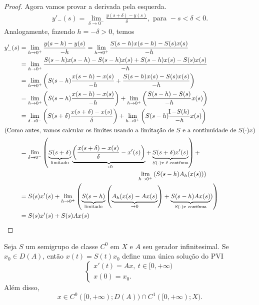 \begin{proof}
Agora vamos provar a derivada pela esquerda.
\begin{align*}
y'_-(s)=\lim_{\delta\to 0^-}\frac{y(s+\delta)-y(s)}{\delta}, \text{ para } -s<\delta <0.
\end{align*}
Analogamente, fazendo $h=-\delta>0$, temos
\begin{align*}
y'_-(s)&=\lim_{h\to 0^+}\frac{y(s-h)-y(s)}{-h}
=\lim_{h\to 0^+}\frac{S(s-h)x(s-h)-S(s)x(s)}{-h}\\
& = \lim_{h\to 0^+}\frac{S(s-h)x(s-h)-S(s-h)x(s)+S(s-h)x(s)-S(s)x(s)}{-h}\\
& = \lim_{h\to 0^+}
\left(S(s-h)\frac{x(s-h)-x(s)}{-h}+\frac{S(s-h)x(s)-S(s)x(s)}{-h}
\right)\\
& = \lim_{h\to 0^+}
\left(S(s-h)\frac{x(s-h)-x(s)}{-h}\right)
+\lim_{h\to 0^+}\left(\frac{S(s-h)-S(s)}{-h}x(s)
\right)\\
& = \lim_{\delta\to 0^-}
\left(S(s+\delta)\frac{x(s+\delta)-x(s)}{\delta}\right)+
\lim_{h\to0^+}\left(S(s-h)\frac{\id- S(h)}{-h}x(s)
\right)\\
\shortintertext{(Como antes, vamos calcular os limites usando a limitação de $S$ e a continuidade de $S(\cdot)x$)}
&\begin{multlined}
= \lim_{\delta\to 0^-}
\left(\underbrace{S(s+\delta)}_{\text{limitado}}
\underbrace{\left(\frac{x(s+\delta)-x(s)}{\delta}-x'(s)\right)}_{\to 0}+\underbrace{S(s+\delta)x'(s)}_{S(\cdot)x \text{ é contínua}}
\right)+\\
\lim_{h\to0^+}\left(S(s-h)A_h(x(s))
\right)
\end{multlined} \\
&= S(s)x'(s)+\lim_{h\to0^+}\left(\underbrace{S(s-h)}_{\text{limitado}}
\left(\underbrace{A_h(x(s)-Ax(s)}_{\to 0}\right)+\underbrace{S(s-h)Ax(s)}_{S(\cdot)x \text{ contínua}})
\right)\\
& = S(s)x'(s)+S(s)Ax(s)
\end{align*}




\end{proof}

\begin{theorem}\label{PVI}

Seja $S$ um semigrupo de classe $C^0$ em $X$ e $A$ seu gerador infinitesimal. Se {$x_0\in D(A)$}, então $x(t)=S(t)x_0$ define {uma única solução} do PVI
\[
\begin{cases}
    x'(t)=Ax,\ t\in [0,+\infty)\\
    x(0)=x_0.
\end{cases}
\]
Além disso, \[x\in  C^0([0,+\infty);D(A))\cap C^1([0,+\infty);X).\]
\end{theorem}

